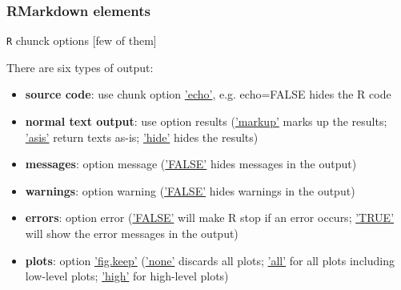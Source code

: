 \documentclass{beamer}
\begin{document}
\begin{frame}
    \frametitle{RMarkdown elements}
	    \centering \Large \texttt{R} chunck options \tiny[few of them]

	    \normalsize There are six types of output:
	\begin{itemize}
		\normalsize
		\item \textbf{source code}: use chunk option \underline{'echo'}, e.g. echo=FALSE hides the R code
	\pause
		\item \textbf{normal text output}: use option results (\underline{'markup'} marks up the results; \underline{'asis'} return texts as-is; \underline{'hide'} hides the results)
	\pause
		\item \textbf{messages}: option message (\underline{'FALSE'} hides messages in the output)
	\pause
		\item \textbf{warnings}: option warning (\underline{'FALSE'} hides warnings in the output)
	\pause
		\item \textbf{errors}: option error (\underline{'FALSE'} will make R stop if an error occurs; \underline{'TRUE'} will show the error messages in the output)
	\pause
\item \textbf{plots}: option \underline{'fig.keep'} (\underline{'none'} discards all plots; \underline{'all'} for all plots including low-level plots; \underline{'high'} for high-level plots)
	\end{itemize}
\end{frame}
\end{document}
